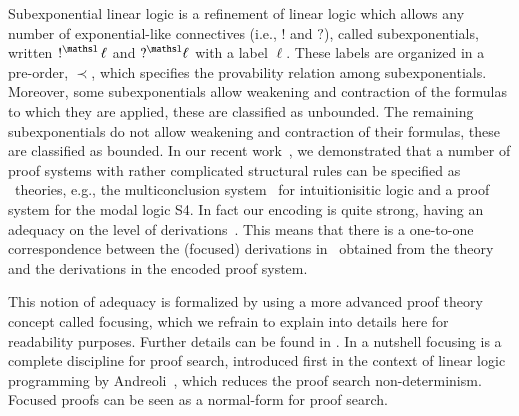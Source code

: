 \documentclass{ebl}
\begin{document}
Subexponential linear logic is a refinement of linear logic which allows any
number of exponential-like connectives (i.e., $!$ and $?$), called
subexponentials, written $\nbang{\ell}$ and $\nquest{\ell}$ with a label $\ell$.
These labels are organized in a pre-order, $\prec$, which specifies the
provability relation among subexponentials. Moreover, some subexponentials allow
weakening and contraction of the formulas to which they are applied, these are
classified as unbounded. The remaining subexponentials do not allow weakening
and contraction of their formulas, these are classified as bounded. 
In our recent work~\cite{nigam.jlc}, we demonstrated that a number of proof
systems with rather complicated structural rules can be specified as \sell\
theories, e.g., the multiconclusion system \mLJ\ for intuitionisitic logic and a
proof system for the modal logic S4.
In fact our encoding is quite strong, having an adequacy on the level of 
derivations~\cite{nigam10jar}. This means that there is a one-to-one correspondence
between the (focused) derivations in \sell\ obtained from the theory and the
derivations in the encoded proof system.

This notion of adequacy is formalized by using a more advanced proof theory
concept called focusing, which we refrain to explain into details here for
readability purposes. Further details can be found in \cite{nigam.jlc}. In a
nutshell focusing is a complete discipline for proof search, introduced first in
the context of linear logic programming by Andreoli~\cite{andreoli92jlc}, which
reduces the proof search non-determinism. Focused proofs can be seen as a
normal-form for proof search. 
\end{document}
